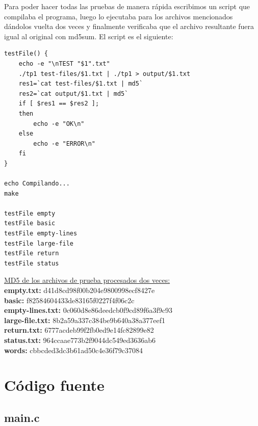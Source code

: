 \documentclass[a4paper,11pt]{article}
\begin{document}
Para poder hacer todas las pruebas de manera r\'apida escribimos un script que compilaba el programa, luego lo ejecutaba para los archivos mencionados d\'andolos vuelta dos veces y finalmente verificaba que el archivo resultante fuera igual al original con md5sum. El script es el siguiente:
\lstset{language=bash, breaklines=true, basicstyle=\normalsize}
\begin{lstlisting}
testFile() {
	echo -e "\nTEST "$1".txt"
	./tp1 test-files/$1.txt | ./tp1 > output/$1.txt
	res1=`cat test-files/$1.txt | md5`
	res2=`cat output/$1.txt | md5`
	if [ $res1 == $res2 ]; 
	then
		echo -e "OK\n"
	else
		echo -e "ERROR\n"
	fi
}

echo Compilando...
make

testFile empty
testFile basic
testFile empty-lines
testFile large-file
testFile return
testFile status
\end{lstlisting}
\underline{MD5 de los archivos de prueba procesados dos veces:}\\
\textbf{empty.txt:} d41d8cd98f00b204e9800998ecf8427e\\
\textbf{basic:} f82584604433de83165f0227f4f06c2c\\
\textbf{empty-lines.txt:} 0c060d8e86deedcb0f9cd89f6a3f9c93\\
\textbf{large-file.txt:} 8b2a59a337c384be9b640a38a377eef1\\
\textbf{return.txt:} 6777acdeb99f2fb0ed9e14fc82899e82\\
\textbf{status.txt:} 964ccaae773b2f9044dc549ed3636ab6\\
\textbf{words:} cbbcded3dc3b61ad50c4e36f79c37084

\section{C\'odigo fuente}
\subsection{main.c}
\end{document}

